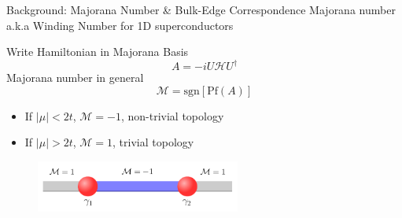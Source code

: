 \documentclass[xcolor=dvipsnames,10pt,aspectratio=169]{beamer}
\newcommand{\ham}{\mathcal{H}}
\newcommand{\BD}{Background}
\begin{document}
  \begin{frame}{\BD: Majorana Number \& Bulk-Edge Correspondence}
    Majorana number a.k.a Winding Number for 1D superconductors

    Write Hamiltonian in Majorana Basis
    \begin{equation}
      A = -i U \ham U^{\dagger}
    \end{equation}
    Majorana number in general
    \begin{equation}
      \mathcal{M} = \text{sgn}[\text{Pf}(A)]
    \end{equation}

    \pause

    \begin{itemize}
      \item If $|\mu| < 2t$, $\mathcal{M} = -1$, non-trivial topology
      \item If $|\mu| > 2t$, $\mathcal{M} = 1$, trivial topology
    \end{itemize}

    \begin{figure}
      \includegraphics[width = 0.6\textwidth]{./figures/bulk-edge.pdf}
    \end{figure}


  \end{frame}
\end{document}
